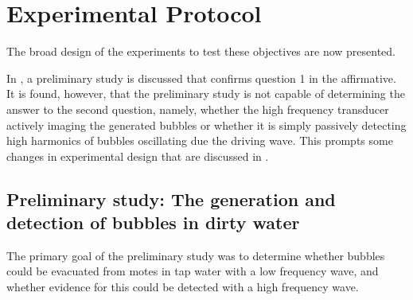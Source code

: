 \section{Experimental Protocol}\label{sec:exp:protocol}

The broad design of the experiments to test these objectives are now presented.

In , a preliminary study is discussed that 
confirms question 1 in the affirmative.
It is found, however, that the preliminary study is not capable of determining the answer to 
the second question, namely,
whether the high frequency transducer actively imaging the generated bubbles
or whether it is simply passively detecting high harmonics
of bubbles oscillating due the driving wave.
This prompts some changes in experimental design that are discussed in .


\subsection{Preliminary study: The generation and detection of bubbles in dirty water}\label{sec:exp:prelim}

The primary goal of the preliminary study was  to determine whether bubbles could be evacuated from motes in tap 
water with a low frequency wave, 
and whether evidence for this could be detected with a high frequency wave.

